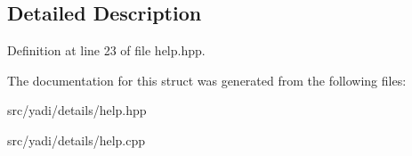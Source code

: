 \subsection{Detailed Description}


Definition at line 23 of file help.\+hpp.



The documentation for this struct was generated from the following files\+:\begin{DoxyCompactItemize}
\item 
src/yadi/details/help.\+hpp\item 
src/yadi/details/help.\+cpp\end{DoxyCompactItemize}

